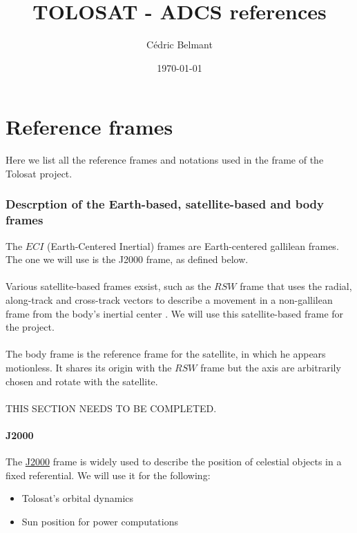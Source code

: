 \documentclass{article}
\title{TOLOSAT - ADCS references}
\author{Cédric Belmant}
\date{\today}
\begin{document}
\maketitle
{}
\tableofcontents

\newpage
\part{Reference frames}
Here we list all the reference frames and notations used in the frame of the Tolosat project.

\section{Descrption of the Earth-based, satellite-based and body frames}

The $ECI$ (Earth-Centered Inertial) frames are Earth-centered gallilean frames. The one we will use is the J2000 frame, as defined below. \\\\
Various satellite-based frames exsist, such as the $RSW$ frame that uses the radial, along-track and cross-track vectors to describe a movement in a non-gallilean frame from the body's inertial center \cite{vallado2004covariance}. We will use this satellite-based frame for the project. \\\\
The body frame is the reference frame for the satellite, in which he appears motionless. It shares its origin with the $RSW$ frame but the axis are arbitrarily chosen and rotate with the satellite. \\\\THIS SECTION NEEDS TO BE COMPLETED.

\subsection{J2000}

The \href{https://en.wikipedia.org/wiki/Earth-centered_inertial}{J2000} frame is widely used to describe the position of celestial objects in a fixed referential. We will use it for the following: \\
\begin{itemize}
\item Tolosat's orbital dynamics
\item Sun position for power computations \\
\end{itemize}
\end{document}
